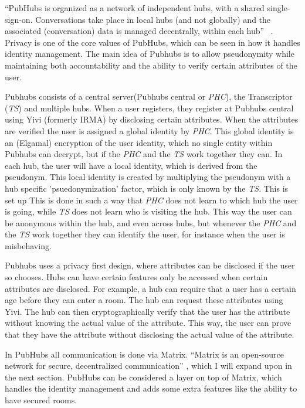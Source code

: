 \documentclass{report}
\begin{document}
“PubHubs is organized as a network of independent hubs, with a shared single-sign-on. Conversations take place in
local hubs (and not globally) and the associated (conversation) data is managed decentrally, within each hub”~
\cite{jacobs_pubhubs_2023}
. Privacy is one of the core values of PubHubs, which can be seen in how it handles identity management. The main
idea of Pubhubs is to allow pseudonymity while maintaining both accountability and the ability to verify certain
attributes of the user.

Pubhubs consists of a central server(Pubhubs central or \textit{PHC}), the Transcriptor (\textit{TS}) and multiple hubs.
When a user registers, they register at Pubhubs central using Yivi (formerly IRMA)\cite{alpar_irma_nodate} by disclosing
certain attributes. When the attributes are verified the user is assigned a global identity by \textit{PHC}.
This global identity is an (Elgamal) encryption of the user identity, which no single entity within Pubhubs
can decrypt, but if the \textit{PHC} and the \textit{TS} work together they can.
In each hub, the user will have a local identity, which is derived from the pseudonym.
This local identity is created by multiplying the pseudonym with a hub specific
'psuedonymization' factor, which is only known by the
\textit{TS}. This is set up This is done in such a way that \textit{PHC} does not learn to which hub the user is going, while
\textit{TS} does not learn who is visiting the hub.
This way the user can be anonymous within the hub, and even across hubs, but whenever the
\textit{PHC} and the \textit{TS} work together they can identify the user, for instance when the user is misbehaving.

Pubhubs uses a privacy first design, where attributes can be disclosed if the user so chooses.
Hubs can have certain features only be accessed
when certain attributes are disclosed. For example, a hub can require that a user has a certain age before they can
enter a room. The hub can request these attributes using Yivi. The hub can then cryptographically verify that the
user has the attribute without knowing the actual
value of
the attribute. This way, the user can prove that they have the attribute without disclosing the actual value of the
attribute.

In PubHubs all communication is done via Matrix. “Matrix is an open-source network for secure, decentralized
communication” \cite{noauthor_matrixorg_nodate}, which I will expand upon in the next section. PubHubs can be considered a
layer on top of Matrix, which handles the identity management and adds some extra features like the ability to have
secured rooms.
\end{document}
